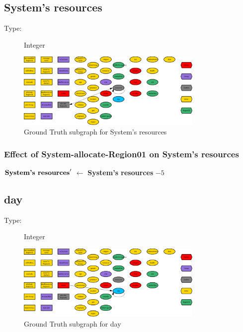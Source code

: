 \documentclass{article}%
\begin{document}
%
\subsection{System's resources}%
\label{subsec:System's resources}%
\begin{description}%
\item[Type:]%
Integer%
\end{description}%


\begin{figure}[ht]%
\centering%
\includegraphics[width=0.8\textwidth]{images/resourcesOfSystem.png}%
\caption{Ground Truth subgraph for System's resources}%
\end{figure}

%
\subsubsection{Effect of System{-}allocate{-}Region01 on System's resources}%
\label{ssubsec:Effect of System{-}allocate{-}Region01 on System's resources}%
\begin{flushleft}%
$\mbox{\textbf{System's resources}} '$%
$\leftarrow$%
\textbf{System's resources}%
${-}5$%
\end{flushleft}

%
\subsection{day}%
\label{subsec:day}%
\begin{description}%
\item[Type:]%
Integer%
\end{description}%


\begin{figure}[ht]%
\centering%
\includegraphics[width=0.8\textwidth]{images/day.png}%
\caption{Ground Truth subgraph for day}%
\end{figure}
\end{document}
